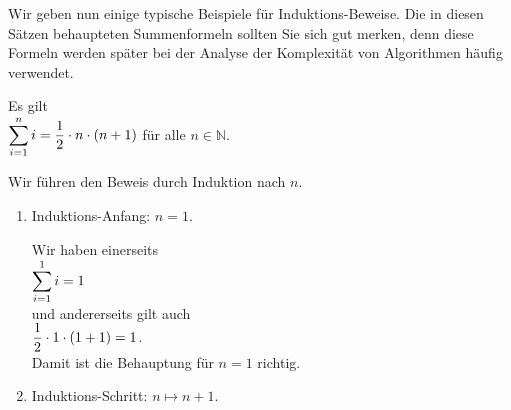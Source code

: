 Wir geben nun einige typische Beispiele für Induktions-Beweise.  Die in diesen Sätzen behaupteten
Summenformeln sollten Sie sich gut merken, denn diese Formeln werden später bei der Analyse der Komplexität
von Algorithmen häufig verwendet.

\begin{Satz} Es gilt 
\\[0.2cm]
\hspace*{1.3cm}
$\displaystyle\sum\limits_{i=1}^n i = \frac{1}{2} \cdot n \cdot (n+1)$ \quad für alle $n \in \mathbb{N}$.
\end{Satz}

\proof
Wir führen den Beweis durch Induktion nach $n$.
\begin{enumerate}
\item Induktions-Anfang: $n=1$.

      Wir haben einerseits
      \\[0.2cm]
      \hspace*{1.3cm}
      $\displaystyle\sum\limits_{i=1}^1 i = 1$
      \\[0.2cm]
      und andererseits gilt auch
      \\[0.2cm]
      \hspace*{1.3cm}
      $\displaystyle\frac{1}{2} \cdot 1 \cdot (1+1) = 1$.
      \\[0.2cm]
      Damit ist die Behauptung für $n=1$ richtig.
\item Induktions-Schritt: $n \mapsto n+1$.


\end{enumerate}
